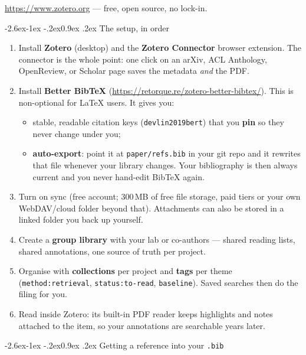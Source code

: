 \documentclass[11pt,a4paper]{article}
\makeatletter
\renewcommand\subsection{\@startsection{subsection}{2}{\z@}%
  {-2.6ex\@plus -1ex \@minus -.2ex}{0.9ex \@plus .2ex}%
  {\normalfont\large\bfseries\color{brandlight}}}
\newcommand{\code}[1]{\texttt{\small #1}}
\makeatother
\begin{document}
\url{https://www.zotero.org} --- free, open source, no lock-in.

\subsection{The setup, in order}

\begin{enumerate}
  \item Install \textbf{Zotero} (desktop) and the \textbf{Zotero Connector}
        browser extension. The connector is the whole point: one click on an
        arXiv, ACL Anthology, OpenReview, or Scholar page saves the metadata
        \emph{and} the PDF.
  \item Install \textbf{Better BibTeX} (\url{https://retorque.re/zotero-better-bibtex/}).
        This is non-optional for LaTeX users. It gives you:
        \begin{itemize}
          \item stable, readable citation keys (\code{devlin2019bert}) that you
                \textbf{pin} so they never change under you;
          \item \textbf{auto-export}: point it at \code{paper/refs.bib} in your
                git repo and it rewrites that file whenever your library
                changes. Your bibliography is then always current and you never
                hand-edit BibTeX again.
        \end{itemize}
  \item Turn on sync (free account; 300\,MB of free file storage, paid tiers or
        your own WebDAV/cloud folder beyond that). Attachments can also be
        stored in a linked folder you back up yourself.
  \item Create a \textbf{group library} with your lab or co-authors --- shared
        reading lists, shared annotations, one source of truth per project.
  \item Organise with \textbf{collections} per project and \textbf{tags} per
        theme (\code{method:retrieval}, \code{status:to-read},
        \code{baseline}). Saved searches then do the filing for you.
  \item Read inside Zotero: its built-in PDF reader keeps highlights and
        notes attached to the item, so your annotations are searchable years
        later.
\end{enumerate}

\subsection{Getting a reference into your \code{.bib}}
\end{document}
